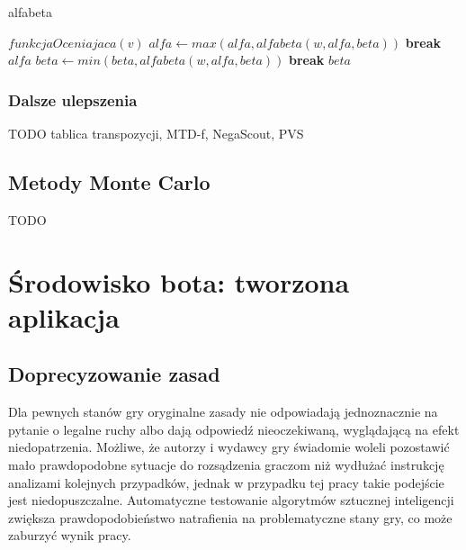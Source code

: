 \documentclass{pracamgr}
\begin{document}
\begin{algorithm}
\caption{alfabeta}\label{alfabeta}
\begin{algorithmic}[1]
	\State \Return $funkcjaOceniajaca(v)$
\EndIf
        \State $alfa \gets max(alfa, alfabeta(w, alfa, beta))$
            \State \textbf{break}
        \EndIf
    \EndFor
	\State \Return $alfa$
\Else
        \State $beta \gets min(beta, alfabeta(w, alfa, beta))$
            \State \textbf{break}
        \EndIf
    \EndFor
	\State \Return $beta$
\EndIf
\EndFunction
\end{algorithmic}
\end{algorithm}


\subsection{Dalsze ulepszenia}

TODO tablica transpozycji, MTD-f, NegaScout, PVS

\section{Metody Monte Carlo}

TODO

\chapter{Środowisko bota: tworzona aplikacja}

\section{Doprecyzowanie zasad}

Dla pewnych stanów gry oryginalne zasady nie odpowiadają jednoznacznie na pytanie o legalne ruchy albo dają odpowiedź nieoczekiwaną, wyglądającą na efekt niedopatrzenia. Możliwe, że autorzy i wydawcy gry świadomie woleli pozostawić mało prawdopodobne sytuacje do rozsądzenia graczom niż wydłużać instrukcję analizami kolejnych przypadków, jednak w przypadku tej pracy takie podejście jest niedopuszczalne. Automatyczne testowanie algorytmów sztucznej inteligencji zwiększa prawdopodobieństwo natrafienia na problematyczne stany gry, co może zaburzyć wynik pracy.
\end{document}
